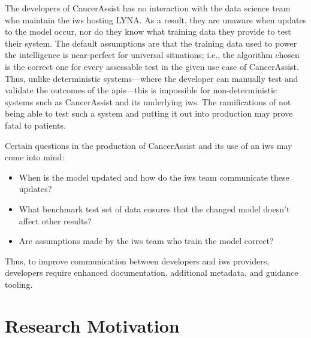 The developers of CancerAssist has no interaction with the data science team who maintain the \gls{iws} hosting LYNA. As a result, they are unaware when updates to the model occur, nor do they know what training data they provide to test their system. The default assumptions are that the training data used to power the intelligence is near-perfect for universal situations; i.e., the algorithm chosen is the correct one for every assessable test in the given use case of CancerAssist. Thus, unlike deterministic systems---where the developer can manually test and validate the outcomes of the \glspl{api}---this is impossible for non-deterministic systems such as CancerAssist and its underlying \gls{iws}. The ramifications of not being able to test such a system and putting it out into production may prove fatal to patients.

Certain questions in the production of CancerAssist and its use of an \gls{iws} may come into mind:

\begin{itemize}%
  \item When is the model updated and how do the \gls{iws} team communicate these updates?
  \item What benchmark test set of data ensures that the changed model doesn't affect other results?
  \item Are assumptions made by the \gls{iws} team who train the model correct?
\end{itemize}

Thus, to improve communication between developers and \gls{iws} providers, developers require enhanced documentation, additional metadata, and guidance tooling. 

\section{Research Motivation}%
\label{sec:introduction:motivation}

